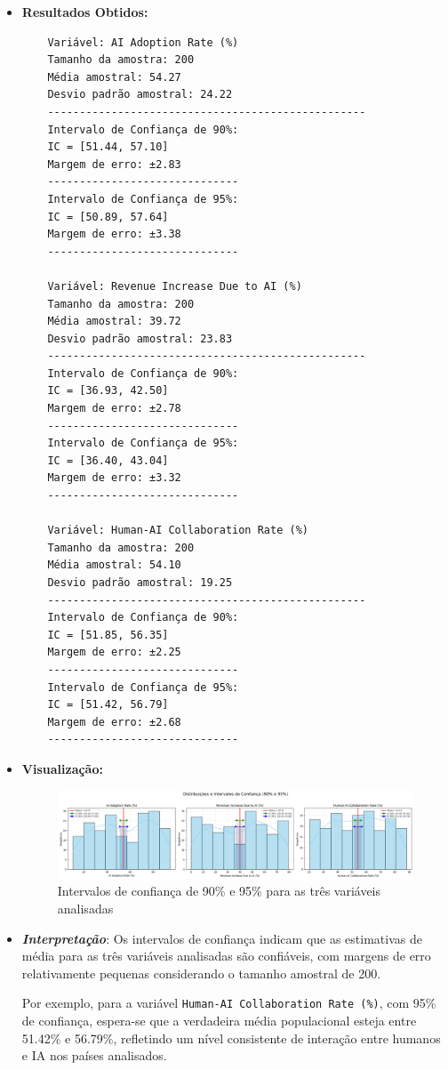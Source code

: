 \documentclass[12pt]{article}
\begin{document}
\begin{itemize}
    \item \textbf{Resultados Obtidos:}
    \begin{verbatim}
    Variável: AI Adoption Rate (%)
    Tamanho da amostra: 200
    Média amostral: 54.27
    Desvio padrão amostral: 24.22
    --------------------------------------------------
    Intervalo de Confiança de 90%:
    IC = [51.44, 57.10]
    Margem de erro: ±2.83
    ------------------------------
    Intervalo de Confiança de 95%:
    IC = [50.89, 57.64]
    Margem de erro: ±3.38
    ------------------------------

    Variável: Revenue Increase Due to AI (%)
    Tamanho da amostra: 200
    Média amostral: 39.72
    Desvio padrão amostral: 23.83
    --------------------------------------------------
    Intervalo de Confiança de 90%:
    IC = [36.93, 42.50]
    Margem de erro: ±2.78
    ------------------------------
    Intervalo de Confiança de 95%:
    IC = [36.40, 43.04]
    Margem de erro: ±3.32
    ------------------------------

    Variável: Human-AI Collaboration Rate (%)
    Tamanho da amostra: 200
    Média amostral: 54.10
    Desvio padrão amostral: 19.25
    --------------------------------------------------
    Intervalo de Confiança de 90%:
    IC = [51.85, 56.35]
    Margem de erro: ±2.25
    ------------------------------
    Intervalo de Confiança de 95%:
    IC = [51.42, 56.79]
    Margem de erro: ±2.68
    ------------------------------
    \end{verbatim}

    \item \textbf{Visualização:}
    
    \begin{figure}[H]
    \centering
    \includegraphics[width=1\textwidth]{intervaloconfianca.png}
    \caption{Intervalos de confiança de 90\% e 95\% para as três variáveis analisadas}
    \end{figure}

    \item \textbf{\textit{Interpretação}}: Os intervalos de confiança indicam que as estimativas de média para as três variáveis analisadas são confiáveis, com margens de erro relativamente pequenas considerando o tamanho amostral de 200. 
    
    Por exemplo, para a variável \texttt{Human-AI Collaboration Rate (\%)}, com 95\% de confiança, espera-se que a verdadeira média populacional esteja entre 51.42\% e 56.79\%, refletindo um nível consistente de interação entre humanos e IA nos países analisados.
    
\end{itemize}
\end{document}
